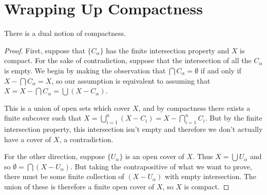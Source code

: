 
\section*{Wrapping Up Compactness}

There is a dual notion of compactness.  


\begin{proof}
	
	First, suppose that $\{C_\alpha\}$ has the finite intersection property and $X$ is compact.  For the sake of contradiction, suppose that the intersection of all the $C_\alpha$ is empty.  We begin by making the observation that $\bigcap C_\alpha = \emptyset$ if and only if $X{-}\bigcap C_\alpha = X$, so our assumption is equivalent to assuming that $X=X{-}\bigcap C_\alpha = \bigcup (X{-}C_\alpha)$.
	
	This is a union of open sets which cover $X$, and by compactness there exists a finite subcover such that $X=\bigcup\limits_{i=1}^n (X{-}C_i) = X{-}\bigcap\limits_{i=1}^n C_i$.  But by the finite intersection property, this intersection isn't empty and therefore we don't actually have a cover of $X$, a contradiction.
	
	For the other direction, suppose $\{U_\alpha\}$ is an open cover of $X$.  Thus $X=\bigcup U_\alpha$ and so $\emptyset = \bigcap(X{-}U_\alpha)$.  But taking the contrapositive of what we want to prove, there must be some finite collection of $(X{-}U_\alpha)$ with empty intersection.  The union of these is therefore a finite open cover of $X$, so $X$ is compact.
	
	
	
	
\end{proof}


